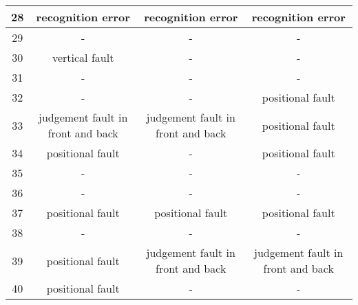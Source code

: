 \begin{table*}[ht]
{\begin{tabular}{|c|c|c|c|}
        28              & recognition error                 & recognition error                 & recognition error                 \\ \hline
        29              & -                                 & -                                 & -                                 \\ \hline
        30              & vertical fault                    & -                                 & -                                 \\ \hline
        31              & -                                 & -                                 & -                                 \\ \hline
        32              & -                                 & -                                 & positional fault                  \\ \hline
        33              & judgement fault in front and back & judgement fault in front and back & positional fault                  \\ \hline
        34              & positional fault                  & -                                 & positional fault                  \\ \hline
        35              & -                                 & -                                 & -                                 \\ \hline
        36              & -                                 & -                                 & -                                 \\ \hline
        37              & positional fault                  & positional fault                  & positional fault                  \\ \hline
        38              & -                                 & -                                 & -                                 \\ \hline
        39              & positional fault                  & judgement fault in front and back & judgement fault in front and back \\ \hline
        40              & positional fault                  & -                                 & -                                 \\ \hline
        \end{tabular}%
        }
    \end{table*}
